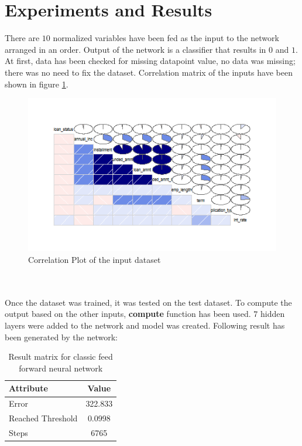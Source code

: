 \documentclass{article}[]
\begin{document}
\section{Experiments and Results}
There are $10$ normalized variables have been fed as the input to the network arranged in an order. Output of the network is a classifier that results in $0$ and $1$. At first, data has been checked for missing datapoint value, no data was missing; there was no need to fix the dataset. Correlation matrix of the inputs have been shown in figure \ref{fig:image1}.
\begin{figure}[!htb]
\centering
\includegraphics[width=1\textwidth]{image2.png}
\caption{Correlation Plot of the input dataset}
\label{fig:image1}
\end{figure}\\\\
Once the dataset was trained, it was tested on the test dataset. To compute the output based on the other inputs, \textbf{compute} function has been used. $7$ hidden layers were added to the network and model was created. Following result has been generated by the network:
\begin{table} 
\caption{Result matrix for classic feed forward neural network} %
\centering      %
\begin{tabular}{l|c}  %
\hline                      %
{\bf Attribute}&{\bf Value}\\
\hline                    %
Error & 322.833\\
Reached Threshold & 0.0998\\
Steps & 6765\\
\hline     %
\end{tabular} 
\label{table:params} 
\end{table} \\\\
\end{document}
